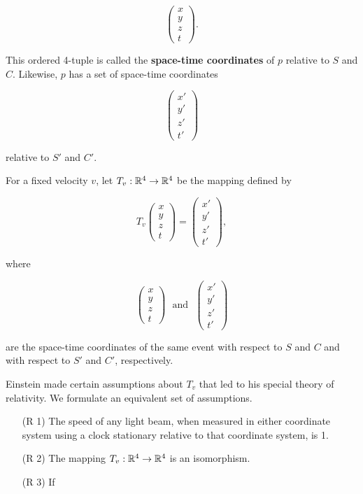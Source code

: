 \begin{definition}
	\[\begin{pmatrix} x \\ y \\ z \\ t \end{pmatrix}.\]

	This ordered 4-tuple is called the \textbf{space-time coordinates} of $p$ relative to $S$ and $C$. Likewise, $p$ has a set of space-time coordinates

	\[\begin{pmatrix} x' \\ y' \\ z' \\ t' \end{pmatrix}\]

	relative to $S'$ and $C'$.

	For a fixed velocity $v$, let $T_v: \mathbb{R}^4 \to \mathbb{R}^4$ be the mapping defined by

	\[T_v \begin{pmatrix}x \\ y \\ z \\ t \end{pmatrix} = \begin{pmatrix} x' \\ y' \\ z' \\ t' \end{pmatrix},\]

	where

	\[\begin{pmatrix}x \\ y \\ z \\ t \end{pmatrix}\ \ \ \text{and}\ \ \ \begin{pmatrix} x' \\ y' \\ z' \\ t' \end{pmatrix}\]

	are the space-time coordinates of the same event with respect to $S$ and $C$ and with respect to $S'$ and $C'$, respectively.

	Einstein made certain assumptions about $T_v$ that led to his special theory of relativity. We formulate an equivalent set of assumptions.

	\begin{enumerate}
		\item[(R 1)] The speed of any light beam, when measured in either coordinate system using a clock stationary relative to that coordinate system, is 1.
		\item[(R 2)] The mapping $T_v: \mathbb{R}^4 \to \mathbb{R}^4$ is an isomorphism.
		\item[(R 3)] If


\end{enumerate}
\end{definition}
